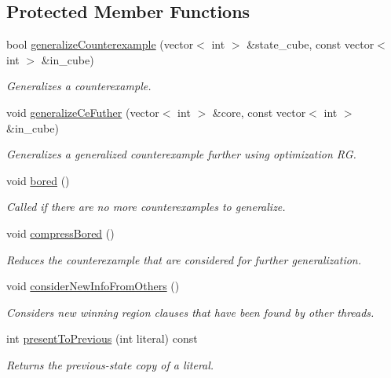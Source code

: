 \subsection*{Protected Member Functions}
\begin{DoxyCompactItemize}
\item 
bool \hyperlink{classCounterGenSAT_a4d04e042ba7ec4b12bab4481fa3d6930}{generalize\-Counterexample} (vector$<$ int $>$ \&state\-\_\-cube, const vector$<$ int $>$ \&in\-\_\-cube)
\begin{DoxyCompactList}\small\item\em Generalizes a counterexample. \end{DoxyCompactList}\item 
void \hyperlink{classCounterGenSAT_a02a8ff723425a617ec93cf247c5e13b3}{generalize\-Ce\-Futher} (vector$<$ int $>$ \&core, const vector$<$ int $>$ \&in\-\_\-cube)
\begin{DoxyCompactList}\small\item\em Generalizes a generalized counterexample further using optimization R\-G. \end{DoxyCompactList}\item 
void \hyperlink{classCounterGenSAT_ad081c192451d0f9004eaa9cf8a482626}{bored} ()
\begin{DoxyCompactList}\small\item\em Called if there are no more counterexamples to generalize. \end{DoxyCompactList}\item 
void \hyperlink{classCounterGenSAT_ae696c35988d55e29d5a54b3c71547c12}{compress\-Bored} ()
\begin{DoxyCompactList}\small\item\em Reduces the counterexample that are considered for further generalization. \end{DoxyCompactList}\item 
void \hyperlink{classCounterGenSAT_a53ed27c0ed65807b1ef6b5180354a0b9}{consider\-New\-Info\-From\-Others} ()
\begin{DoxyCompactList}\small\item\em Considers new winning region clauses that have been found by other threads. \end{DoxyCompactList}\item 
int \hyperlink{classCounterGenSAT_a8fcbe30bb64946f9e7dc92763a392d3c}{present\-To\-Previous} (int literal) const 
\begin{DoxyCompactList}\small\item\em Returns the previous-\/state copy of a literal. \end{DoxyCompactList}\item 

\end{DoxyCompactItemize}
